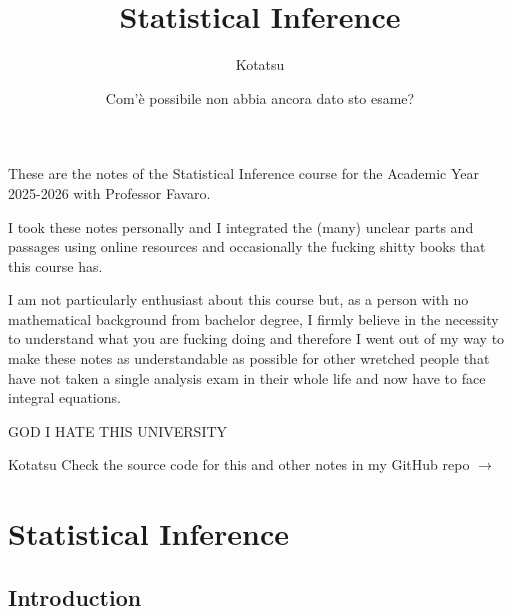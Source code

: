 \documentclass[12pt]{report}
\begin{document}
	\title{Statistical Inference}
	\author{Kotatsu}
	\date{\small Com'è possibile non abbia ancora dato sto esame?}
	\maketitle
	\begin{preface}
		These are the notes of the Statistical Inference course for the Academic Year 2025-2026 with Professor Favaro.\par
		I took these notes personally and I integrated the (many) unclear parts and passages using online resources and occasionally the fucking shitty books that this course has. \par
		I am not particularly enthusiast about this course but, as a person with no mathematical background from bachelor degree, I firmly believe in the necessity to understand what you are fucking doing and therefore I went out of my way to make these notes as understandable as possible for other wretched people that have not taken a single analysis exam in their whole life and now have to face integral equations. 
		
		GOD I HATE THIS UNIVERSITY
		\vskip1.2cm
		
		\hfill Kotatsu
		\vskip1.2cm
		Check the source code for this and other notes in my GitHub repo $\to$ \href{https://github.com/godblessourdeadkotatsu/lecture-notes-2024-25/tree/main/SI}{\faGithubSquare}
	\end{preface}
	\clearpage
	\tableofcontents
\chapter{Statistical Inference}
\section{Introduction}
\end{document}

